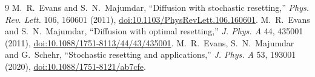\documentclass[10pt]{article}
\begin{document}
\begin{thebibliography}{9}\small
{} M.~R.~Evans and S.~N.~Majumdar, ``Diffusion with stochastic
resetting,'' \emph{Phys. Rev. Lett.} 106, 160601 (2011),
\href{https://doi.org/10.1103/PhysRevLett.106.160601}{doi:10.1103/PhysRevLett.106.160601}.
 M.~R.~Evans and S.~N.~Majumdar, ``Diffusion with optimal
resetting,'' \emph{J. Phys. A} 44, 435001 (2011),
\href{https://doi.org/10.1088/1751-8113/44/43/435001}{doi:10.1088/1751-8113/44/43/435001}.
 M.~R.~Evans, S.~N.~Majumdar and G.~Schehr, ``Stochastic
resetting and applications,'' \emph{J. Phys. A} 53, 193001 (2020),
\href{https://doi.org/10.1088/1751-8121/ab7cfe}{doi:10.1088/1751-8121/ab7cfe}.
\end{thebibliography}
\end{document}
